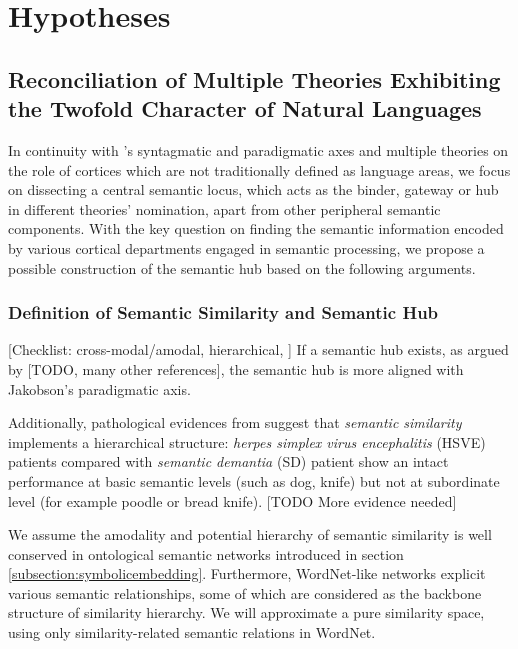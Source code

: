 \chapter{Hypotheses} %

\label{chap:hypotheses} %

\section{Reconciliation of Multiple Theories Exhibiting the Twofold Character of Natural Languages}

In continuity with \cite{jakobsonFundamentalsLanguage1963}'s syntagmatic and paradigmatic axes and multiple theories on the role of cortices which are not traditionally defined as language areas, we focus on dissecting a central semantic locus, which acts as the binder, gateway or hub in different theories' nomination, apart from other peripheral semantic components. With the key question on finding the semantic information encoded by various cortical departments engaged in semantic processing, we propose a possible construction of the semantic hub based on the following arguments.

\subsection{Definition of Semantic Similarity and Semantic Hub}

\label{subsection:hypsemantichub}

[Checklist: cross-modal/amodal, hierarchical, ]
If a semantic hub exists, as argued by \cite{pattersonWhereYouKnow2007, ralphNeuralComputationalBases2017} [TODO, many other references], the semantic hub is more aligned with Jakobson's paradigmatic axis. 

Additionally, pathological evidences from \cite{pattersonWhereYouKnow2007} suggest that \emph{semantic similarity} implements a hierarchical structure: \emph{herpes simplex virus encephalitis} (HSVE) patients compared with \emph{semantic demantia} (SD) patient show an intact performance at basic semantic levels (such as dog, knife) but not at subordinate level (for example poodle or bread knife). [TODO More evidence needed]

We assume the amodality and potential hierarchy of semantic similarity is well conserved in ontological semantic networks introduced in section \ref{subsection:symbolicembedding}. Furthermore, WordNet-like networks explicit various semantic relationships, some of which are considered as the backbone structure of similarity hierarchy. We will approximate a pure similarity space, using only similarity-related semantic relations in WordNet. 

